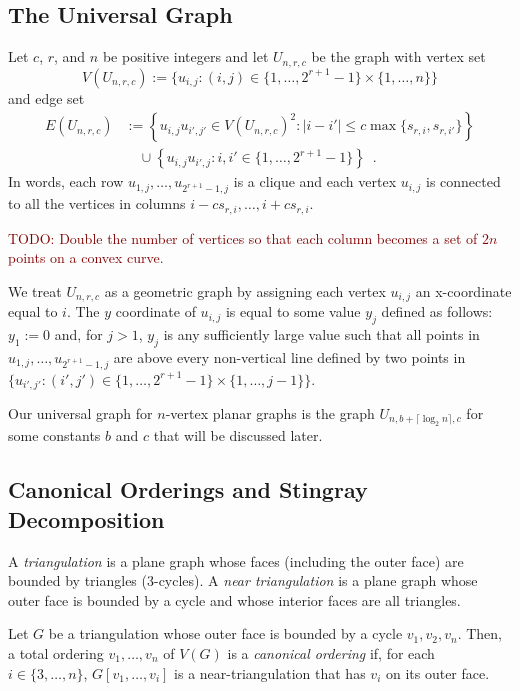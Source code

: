 \documentclass{patmorin}
\newcommand{\ipat}[1]{\textcolor{Maroon}{#1}}
\newcommand{\defin}[1]{\emph{\color{brightmaroon}#1}}
\begin{document}
\subsection{The Universal Graph}

Let $c$, $r$, and $n$ be positive integers and let $U_{n,r,c}$ be the graph with vertex set
\[
  V(U_{n,r,c}):=\{ u_{i,j}: (i,j)\in\{1,\ldots,2^{r+1}-1\}\times \{1,\ldots,n\}\}
\]
and edge set
\begin{align*}
  E(U_{n,r,c}) & := \left\{ u_{i,j}u_{i',j'} \in V(U_{n,r,c})^2: |i-i'| \le c\max\{s_{r,i},s_{r,i'}\}\right\} \\
  & \quad {}\cup\left\{u_{i,j}u_{i',j}:i,i'\in\{1,\ldots,2^{r+1}-1\}\right\}\enspace .
\end{align*}
In words, each row $u_{1,j},\ldots,u_{2^{r+1}-1,j}$ is a clique and each vertex $u_{i,j}$ is connected to all the vertices in columns $i-cs_{r,i},\ldots,i+cs_{r,i}$.

\ipat{TODO: Double the number of vertices so that each column becomes a set of $2n$ points on a convex curve.}

We treat $U_{n,r,c}$ as a geometric graph by assigning each vertex $u_{i,j}$ an x-coordinate equal to $i$.  The $y$ coordinate of $u_{i,j}$ is equal to some value $y_j$ defined as follows:  $y_1:=0$ and, for $j>1$, $y_j$ is any sufficiently large value such that all points in $u_{1,j},\ldots,u_{2^{r+1}-1,j}$ are above every non-vertical line defined by two points in $\{u_{i',j'}:(i',j')\in\{1,\ldots,2^{r+1}-1\}\times\{1,\ldots,j-1\}\}$.

Our universal graph for $n$-vertex planar graphs is the graph $U_{n,b+\lceil\log_2 n\rceil,c}$ for some constants $b$ and $c$ that will be discussed later.

\subsection{Canonical Orderings and Stingray Decomposition}

A \defin{triangulation} is a plane graph whose faces (including the outer face) are bounded by triangles ($3$-cycles). A \defin{near triangulation} is a plane graph whose outer face is bounded by a cycle and whose interior faces are all triangles.

Let $G$ be a triangulation whose outer face is bounded by a cycle $v_1,v_2,v_n$.  Then, a total ordering $v_1,\ldots,v_n$ of $V(G)$ is a \defin{canonical ordering} if, for each $i\in\{3,\ldots,n\}$,  $G[v_1,\ldots,v_i]$ is a near-triangulation that has $v_i$ on its outer face.
\end{document}

